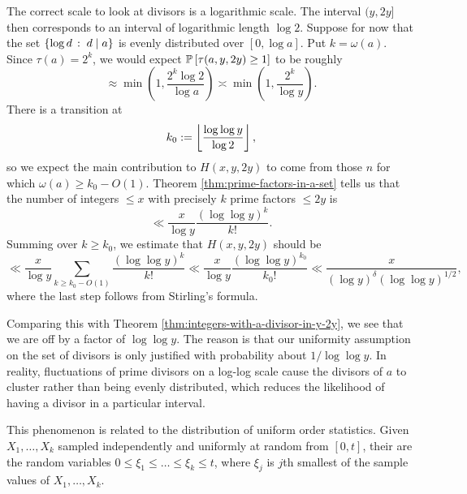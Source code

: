 The correct scale to look at divisors is a logarithmic scale.
The interval $(y, 2y]$ then corresponds to an interval of logarithmic length $\log 2$.
Suppose for now that the set $\left\{\log d\,:\;d \mid a\right\}$ is evenly distributed over $[0, \log a]$. 
Put $k = \omega(a)$. Since $\tau(a) = 2^k$, we would expect $\mathbb{P}\left[\tau(a, y, 2y) \ge 1\right]$ to be roughly
\begin{equation*}
    \approx \min\left(1, \frac{2^k \log 2}{\log a}\right) \asymp \min\left(1, \frac{2^k}{\log y}\right).
\end{equation*}
There is a transition at
\begin{equation*}
    k_0 := \left\lfloor \frac{\log \log y}{\log 2} \right\rfloor,
\end{equation*}
so we expect the main contribution to $H(x,y,2y)$ to come from those $n$ for which $\omega(a) \ge k_0 - O(1)$.
Theorem \ref{thm:prime-factors-in-a-set} tells us that the number of integers $\le x$ with precisely $k$ prime factors $\le 2y$ is 
\begin{equation*}
    \ll \frac{x}{\log y} \frac{(\log \log y)^k}{k!}.
\end{equation*}
Summing over $k \ge k_0$, we estimate that $H(x, y, 2y)$ should be
\begin{equation*}
    \ll \frac{x}{\log y} \sum \limits_{k \ge k_0 - O(1)} \frac{(\log \log y)^k}{k!} \ll \frac{x}{\log y} \frac{(\log \log y)^{k_0}}{k_0!} \ll \frac{x}{(\log y)^\delta (\log \log y)^{1/2}},
\end{equation*}
where the last step follows from Stirling's formula.

Comparing this with Theorem \ref{thm:integers-with-a-divisor-in-y-2y}, we see that we are off by a factor of $\log \log y$.
The reason is that our uniformity assumption on the set of divisors is only justified with probability about $1/\log \log y$.
In reality, fluctuations of prime divisors on a log-log scale cause the divisors of $a$ to cluster rather than being evenly distributed, which reduces the likelihood of having a divisor in a particular interval. 

This phenomenon is related to the distribution of uniform order statistics. 
Given $X_1, \dots, X_k$ sampled independently and uniformly at random from $[0, t]$, their  are the random variables $0 \le \xi_1 \le \dots \le \xi_k \le t$, where $\xi_j$ is $j$th smallest of the sample values of $X_1, \dots, X_k$.

